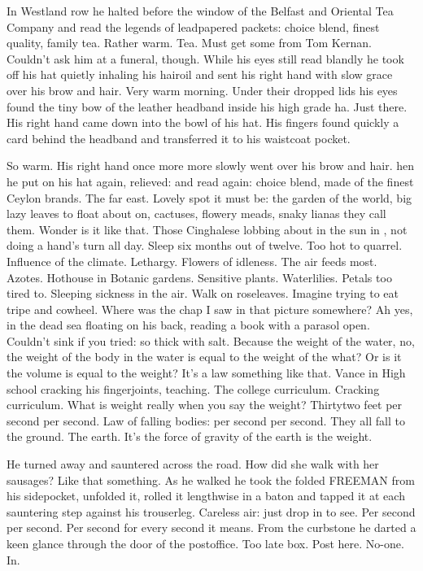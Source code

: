 In Westland row
he halted before the window of the Belfast and Oriental Tea Company
and read the legends of leadpapered packets:
choice blend, finest quality, family tea.
Rather warm.
Tea.
Must get some from Tom Kernan.
Couldn't ask him at a funeral, though.
While his eyes still read blandly
he took off his hat
quietly inhaling his hairoil
and sent his right hand with slow grace over his brow and hair.
Very warm morning.
Under their dropped lids
his eyes found the tiny bow of the leather headband inside his high grade ha.
Just there.
His right hand came down into the bowl of his hat.
His fingers found quickly a card behind the headband
and transferred it to his waistcoat pocket.

So warm.
His right hand once more more slowly went over his brow and hair. 
hen he put on his hat again, relieved:
and read again:
choice blend, made of the finest Ceylon brands.
The far east.
Lovely spot it must be:
the garden of the world,
big lazy leaves to float about on,
cactuses, flowery meads,
snaky lianas they call them.
Wonder is it like that.
Those Cinghalese lobbing about in the sun in ,
not doing a hand's turn all day.
Sleep six months out of twelve.
Too hot to quarrel.
Influence of the climate.
Lethargy.
Flowers of idleness.
The air feeds most.
Azotes.
Hothouse in Botanic gardens.
Sensitive plants.
Waterlilies.
Petals too tired to.
Sleeping sickness in the air.
Walk on roseleaves.
Imagine trying to eat tripe and cowheel.
Where was the chap I saw in that picture somewhere?
Ah yes, in the dead sea floating on his back,
reading a book with a parasol open.
Couldn't sink if you tried:
so thick with salt.
Because the weight of the water,
no, the weight of the
body in the water
is equal to the weight of the what?
Or is it the volume
is equal to the weight?
It's a law something like that.
Vance in High school cracking his fingerjoints, teaching.
The college curriculum.
Cracking curriculum.
What is weight really when you say the weight?
Thirtytwo feet per second per second.
Law of falling bodies:
per second per second.
They all fall to the ground.
The earth.
It's the force of gravity of the earth
is the weight.

He turned away and sauntered across the road. How did she walk with her
sausages? Like that something. As he walked he took the folded FREEMAN
from his sidepocket, unfolded it, rolled it lengthwise in a baton and
tapped it at each sauntering step against his trouserleg. Careless air:
just drop in to see. Per second per second. Per second for every second
it means. From the curbstone he darted a keen glance through the door of
the postoffice. Too late box. Post here. No-one. In.

